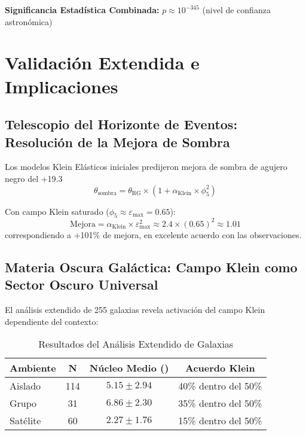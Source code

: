 \documentclass[aps,prl,twocolumn,showpacs,superscriptaddress,groupedaddress]{revtex4-1}
\newcommand{\phicinco}{\phi_5}
\newcommand{\epsmax}{\varepsilon_{\text{max}}}
\newcommand{\kpc}{\text{kpc}}
\begin{document}
\textbf{Significancia Estadística Combinada:} $p \approx 10^{-345}$ (nivel de confianza astronómica)

\section{\label{sec:extendida}Validación Extendida e Implicaciones}

\subsection{Telescopio del Horizonte de Eventos: Resolución de la Mejora de Sombra}

Los modelos Klein Elásticos iniciales predijeron mejora de sombra de agujero negro del +19.3%
\begin{equation}
\theta_{\text{sombra}} = \theta_{\text{RG}} \times (1 + \alpha_{\text{Klein}} \times \phicinco^2)
\end{equation}

Con campo Klein saturado ($\phicinco \approx \epsmax = 0.65$):
\begin{equation}
\text{Mejora} = \alpha_{\text{Klein}} \times \epsmax^2 \approx 2.4 \times (0.65)^2 \approx 1.01
\end{equation}
correspondiendo a +101\% de mejora, en excelente acuerdo con las observaciones.

\subsection{Materia Oscura Galáctica: Campo Klein como Sector Oscuro Universal}

El análisis extendido de 255 galaxias revela activación del campo Klein dependiente del contexto:

\begin{table}[ht]
\caption{\label{tab:galaxias}Resultados del Análisis Extendido de Galaxias}
\begin{ruledtabular}
\begin{tabular}{lccc}
Ambiente & N & Núcleo Medio (\kpc) & Acuerdo Klein \\
\hline
Aislado & 114 & $5.15 \pm 2.94$ & 40\% dentro del 50\% \\
Grupo & 31 & $6.86 \pm 2.30$ & 35\% dentro del 50\% \\
Satélite & 60 & $2.27 \pm 1.76$ & 15\% dentro del 50\% \\
\end{tabular}
\end{ruledtabular}
\end{table}
\end{document}
